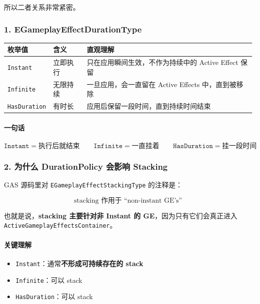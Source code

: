 \documentclass[CJKmath=true,10pt]{MyBook}
\begin{document}
所以二者关系非常紧密。

\subsubsection{1. EGameplayEffectDurationType}

\begin{longtable}{@{}p{}p{}p{}@{}}
	\toprule
	\textbf{枚举值} & \textbf{含义} & \textbf{直观理解} \\
	\midrule
	\endhead
	
	\texttt{Instant}
	&
	立即执行
	&
	只在应用瞬间生效，不作为持续中的 Active Effect 保留
	\\
	
	\texttt{Infinite}
	&
	无限持续
	&
	一旦应用，会一直留在 Active Effects 中，直到被移除
	\\
	
	\texttt{HasDuration}
	&
	有时长
	&
	应用后保留一段时间，直到持续时间结束
	\\
	
	\bottomrule
\end{longtable}

\paragraph{一句话}
\[
\texttt{Instant} = 执行后就结束
\qquad
\texttt{Infinite} = 一直挂着
\qquad
\texttt{HasDuration} = 挂一段时间
\]

\subsubsection{2. 为什么 DurationPolicy 会影响 Stacking}

GAS 源码里对 \texttt{EGameplayEffectStackingType} 的注释是：

\[
\text{stacking 作用于 ``non-instant GE's''}
\]

也就是说，\textbf{stacking 主要针对非 Instant 的 GE}，因为只有它们会真正进入
\texttt{ActiveGameplayEffectsContainer}。

\paragraph{关键理解}
\begin{itemize}
	\item \texttt{Instant}：通常\textbf{不形成可持续存在的 stack}
	\item \texttt{Infinite}：可以 stack
	\item \texttt{HasDuration}：可以 stack
\end{itemize}
\end{document}
